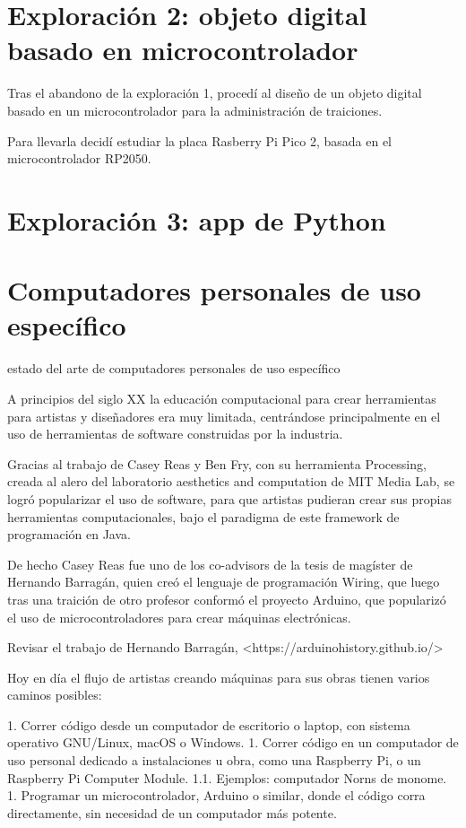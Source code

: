 \documentclass{article}
\begin{document}
\clearpage

\section{Exploración 2: objeto digital basado en microcontrolador}

Tras el abandono de la exploración 1, procedí al diseño de un objeto digital basado en un microcontrolador para la administración de traiciones.

Para llevarla decidí estudiar la placa  Rasberry Pi Pico 2, basada en el microcontrolador RP2050.



\clearpage


\section{Exploración 3: app de Python}

\section{Computadores personales de uso específico}

estado del arte de computadores personales de uso específico

A principios del siglo XX la educación computacional para crear herramientas para artistas y diseñadores era muy limitada, centrándose principalmente en el uso de herramientas de software construidas por la industria.

Gracias al trabajo de Casey Reas y Ben Fry, con su herramienta Processing, creada al alero del laboratorio aesthetics and computation de MIT Media Lab, se logró popularizar el uso de software, para que artistas pudieran crear sus propias herramientas computacionales, bajo el paradigma de este framework de programación en Java.

De hecho Casey Reas fue uno de los co-advisors de la tesis de magíster de Hernando Barragán, quien creó el lenguaje de programación Wiring, que luego tras una traición de otro profesor conformó el proyecto Arduino, que popularizó el uso de microcontroladores para crear máquinas electrónicas.

Revisar el trabajo de Hernando Barragán, <https://arduinohistory.github.io/>

Hoy en día el flujo de artistas creando máquinas para sus obras tienen varios caminos posibles:

1. Correr código desde un computador de escritorio o laptop, con sistema operativo GNU/Linux, macOS o Windows.
1. Correr código en un computador de uso personal dedicado a instalaciones u obra, como una Raspberry Pi, o un Raspberry Pi Computer Module.
  1.1. Ejemplos: computador Norns de monome.
1. Programar un microcontrolador, Arduino o similar, donde el código corra directamente, sin necesidad de un computador más potente.
\end{document}
